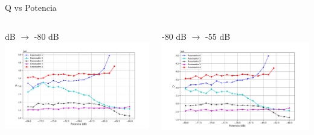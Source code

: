 \documentclass[ignorenonframetext,12pt]{beamer}
\begin{document}
\begin{frame}{Q vs Potencia}
			\begin{columns}
				\begin{column}{0.49\textwidth}
					\qquad {} dB $\to$ -80 dB
					\centering
					\includegraphics[height=0.45\textheight,width=1.1\textwidth]{Q_vs_P_tot_des}
				\end{column}
				\begin{column}{0.49\textwidth}
					-80 dB $\to$ -55 dB
					\centering
					\includegraphics[height=0.45\textheight,width=1.1\textwidth]{Q_vs_P_tot_asc}
				\end{column}
			\end{columns}

		\end{frame}

\end{document}
